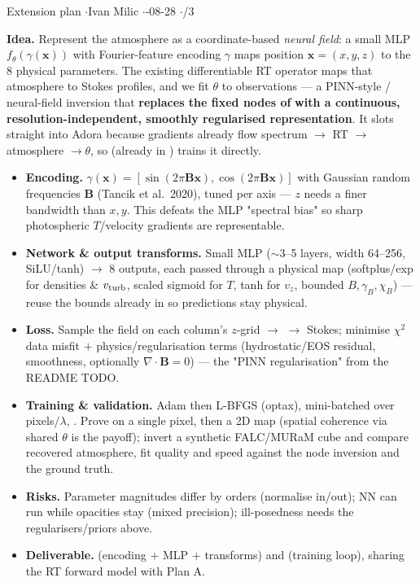 


%
{Extension plan \quad$\cdot$\quad Ivan Milic \quad$\cdot$-08-28 \quad$\cdot$/3}

\textbf{Idea.} Represent the atmosphere as a coordinate-based \emph{neural field}: a small MLP
$f_\theta(\gamma(\mathbf{x}))$ with Fourier-feature encoding $\gamma$ maps position $\mathbf{x}=(x,y,z)$ to the
8 physical parameters. The existing differentiable RT operator maps that atmosphere to Stokes profiles, and we
fit $\theta$ to observations --- a PINN-style / neural-field inversion that \textbf{replaces the fixed nodes of}
 \textbf{with a continuous, resolution-independent, smoothly regularised representation}. It slots
straight into Adora because gradients already flow spectrum $\to$ RT $\to$ atmosphere $\to \theta$, so
 (already in ) trains it directly.

\begin{itemize}
  \item \textbf{Encoding.} $\gamma(\mathbf{x})=[\sin(2\pi \mathbf{B}\mathbf{x}),\cos(2\pi \mathbf{B}\mathbf{x})]$ with
        Gaussian random frequencies $\mathbf{B}$ (Tancik et al.\ 2020), tuned per axis --- $z$ needs a finer
        bandwidth than $x,y$. This defeats the MLP "spectral bias" so sharp photospheric $T$/velocity gradients
        are representable.
  \item \textbf{Network \& output transforms.} Small MLP ($\sim$3--5 layers, width 64--256, SiLU/tanh) $\to$ 8
        outputs, each passed through a physical map (softplus/exp for densities \& $v_{\rm turb}$, scaled sigmoid
        for $T$, tanh for $v_z$, bounded $B,\gamma_B,\chi_B$) --- reuse the bounds already in  so
        predictions stay physical.
  \item \textbf{Loss.} Sample the field on each column's $z$-grid $\to$  $\to$ Stokes;
        minimise $\chi^2$ data misfit $+$ physics/regularisation terms (hydrostatic/EOS residual, smoothness,
        optionally $\nabla\!\cdot\!\mathbf{B}=0$) --- the "PINN regularisation" from the README TODO.
  \item \textbf{Training \& validation.} Adam then L-BFGS (optax), mini-batched over pixels/$\lambda$, .
        Prove on a single pixel, then a 2D map (spatial coherence via shared $\theta$ is the payoff); invert a
        synthetic FALC/MURaM cube and compare recovered atmosphere, fit quality and speed against the
         node inversion and the ground truth.
  \item \textbf{Risks.} Parameter magnitudes differ by orders (normalise in/out); NN can run  while
        opacities stay  (mixed precision); ill-posedness needs the regularisers/priors above.
  \item \textbf{Deliverable.}  (encoding $+$ MLP $+$ transforms) and 
        (training loop), sharing the RT forward model with Plan A.
\end{itemize}


